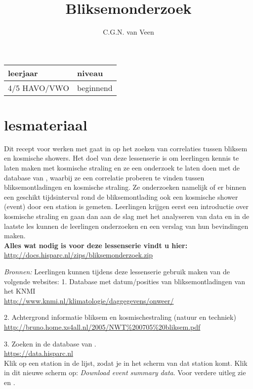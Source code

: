 
\usepackage{xfrac}
\usepackage{array}

\title{Bliksemonderzoek}
\author{C.G.N. van Veen}



\maketitle

\begin{tabular}{|>{\raggedright}p{3cm}|>{\raggedright}p{12cm}|}
\hline
leerjaar & niveau \tabularnewline
\hline
4/5 HAVO/VWO  & beginnend \tabularnewline
\hline
\end{tabular}

\section{lesmateriaal}

Dit recept voor werken met \hisparc gaat in op het zoeken van correlaties tussen
bliksem en kosmische showers. Het doel van deze lessenserie is om leerlingen
kennis te laten maken met kosmische straling en ze een onderzoek te laten doen
met de database van \hisparc, waarbij ze een correlatie proberen te vinden tussen
bliksemontladingen en kosmische straling. Ze onderzoeken namelijk of er binnen een geschikt
tijdsinterval rond de bliksemontlading ook een kosmische shower (event) door
een \hisparc station is gemeten.
Leerlingen krijgen eerst een introductie over kosmische straling en gaan
dan aan de slag met het analyseren van \hisparc data en in de laatste les kunnen
de leerlingen onderzoeken en een verslag van hun bevindingen maken.
\\

\textbf{Alles wat nodig is voor deze lessenserie vindt u hier:}\\
\url{http://docs.hisparc.nl/zips/bliksemonderzoek.zip}


\textit{Bronnen:} Leerlingen kunnen tijdens deze lessenserie gebruik maken van de
volgende websites:
1. Database met datum/posities van bliksemontladingen van het KNMI\\
\url{ http://www.knmi.nl/klimatologie/daggegevens/onweer/}

2. Achtergrond informatie bliksem en kosmischestraling (natuur en techniek)\\
\url{ http://bruno.home.xs4all.nl/2005/NWT%200705%20bliksem.pdf}

3. Zoeken in de database van \hisparc.\\
\url{https://data.hisparc.nl}\\
Klik op een station in de lijst, zodat je in het scherm van dat station komt.
Klik in dit nieuwe scherm op: \textit{Download event summary data}.
Voor verdere uitleg zie  en .

